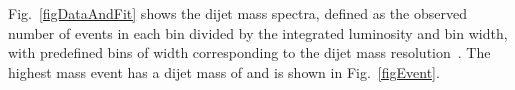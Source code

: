 Fig.~\ref{figDataAndFit} shows
the dijet mass spectra, defined as the observed number of events in each bin divided by the
integrated luminosity and bin width, with predefined bins of width corresponding to the
dijet mass resolution~\cite{Khachatryan:2010jd}. 
The highest mass event has a dijet mass of \highestMass and is shown in Fig.~\ref{figEvent}. 
\begin{figure}[hbtp]
  \begin{center}

\end{center}
\end{figure}
